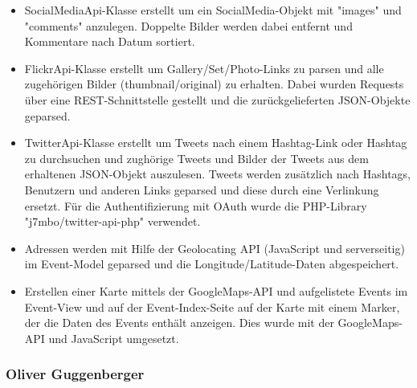 \documentclass{article}
\begin{document}
\begin{description}
\begin{itemize}
            \item SocialMediaApi-Klasse erstellt um ein SocialMedia-Objekt mit "images" und "comments" anzulegen.                    Doppelte Bilder werden dabei entfernt und Kommentare nach Datum sortiert.
            \item FlickrApi-Klasse erstellt um Gallery/Set/Photo-Links zu parsen und alle zugehörigen Bilder                         (thumbnail/original) zu erhalten. Dabei wurden Requests über eine REST-Schnittstelle gestellt und die zurückgelieferten JSON-Objekte geparsed.
            \item TwitterApi-Klasse erstellt um Tweets nach einem Hashtag-Link oder Hashtag zu durchsuchen und zughörige Tweets und Bilder der Tweets aus dem erhaltenen JSON-Objekt auszulesen. Tweets werden zusätzlich nach Hashtags, Benutzern und anderen Links geparsed und diese durch eine Verlinkung ersetzt. Für die Authentifizierung mit OAuth wurde die PHP-Library "j7mbo/twitter-api-php" verwendet.
            \item Adressen werden mit Hilfe der Geolocating API (JavaScript und serverseitig) im Event-Model geparsed und             die Longitude/Latitude-Daten abgespeichert.
            \item Erstellen einer Karte mittels der GoogleMaps-API und aufgelistete Events im Event-View und auf der Event-Index-Seite auf der Karte mit einem Marker, der die Daten des Events enthält anzeigen. Dies wurde mit der GoogleMaps-API und JavaScript umgesetzt.
            \end{itemize}
            
\end{description}


\subsubsection{Oliver Guggenberger}
\end{document}
